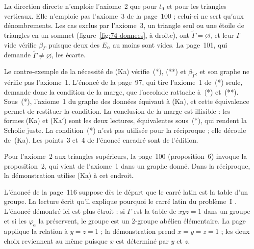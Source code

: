 \begin{remarque}
La direction directe n'emploie l'axiome~2 que pour $t_0$ et pour les triangles verticaux. Elle n'emploie pas l'axiome~3 de la page~100 ; celui-ci ne sert qu'aux dénombrements. Les cas exclus par l'axiome~3, un triangle seul ou une étoile de triangles en un sommet (figure~\ref{fig:74-donnees}, à droite), ont $\widetilde\Gamma = \varnothing$, et leur $\Gamma$ vide vérifie $\beta_\Gamma$ puisque deux des $E_\alpha$ au moins sont vides. La page~101, qui demande $\widetilde\Gamma \neq \varnothing$, les écarte.
\end{remarque}

\begin{remarque}
Le contre-exemple de la nécessité de (Ka) vérifie~(*), (**) et $\beta_{\widetilde\Gamma}$, et son graphe ne vérifie pas l'axiome~1. L'énoncé de la page~97, qui tire l'axiome~1 de~(*) seule, demande donc la condition de la marge, que l'accolade rattache à~(*) et~(**). Sous~(*), l'axiome~1 du graphe des données équivaut à (Ka), et cette équivalence permet de restituer la condition. La conclusion de la marge est illisible : les formes (Ka) et (Ka$'$) sont les deux lectures, équivalentes sous~(*), qui rendent la Scholie juste. La condition~(*) n'est pas utilisée pour la réciproque ; elle découle de~(Ka). Les points~3 et~4 de l'énoncé encadré sont de l'édition.
\end{remarque}

\begin{remarque}
Pour l'axiome~2 aux triangles supérieurs, la page~100 (proposition~6) invoque la proposition~2, qui vient de l'axiome~1 dans un graphe donné. Dans la réciproque, la démonstration utilise (Ka) à cet endroit.
\end{remarque}

\begin{remarque}
L'énoncé de la page~116 suppose dès le départ que le carré latin est la table d'un groupe. La lecture écrit qu'il explique pourquoi le carré latin du problème~I . L'énoncé démontré ici est plus étroit : si $\Gamma$ est la table de $xyz = 1$ dans un groupe et si les $\varphi_a$ la préservent, le groupe est un $2$-groupe abélien élémentaire. La page applique la relation à $y = z = 1$ ; la démonstration prend $x = y = z = 1$ ; les deux choix reviennent au même puisque $x$ est déterminé par $y$ et $z$.
\end{remarque}

